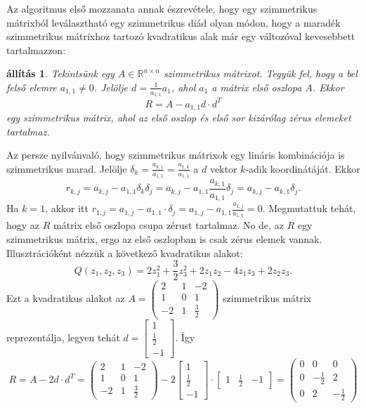 \documentclass[9pt, a4paper, showtrims]{memoir}
\makeatletter
\renewenvironment{proof}[1][\proofname]
    {\par\pushQED{\qed}%
    \normalfont \topsep6\p@\@plus6\p@\relax
    \trivlist
    \item[\hskip\labelsep
        \itshape
    #1\@addpunct{:}]\ignorespaces}
    {\popQED\endtrivlist\@endpefalse}
\theoremstyle{plain}
\newtheorem{proposition}{állítás}[chapter]
\theoremstyle{remark}
\theoremstyle{definition}
\makeatother
\begin{document}
Az algoritmus első mozzanata annak észrevétele, 
hogy egy szimmetrikus mátrixból leválasztható egy szimmetrikus diád olyan módon,
hogy a maradék szimmetrikus mátrixhoz tartozó kvadratikus alak már egy változóval kevesebbett tartalmazzon:
\begin{proposition}
    Tekintsünk egy $A\in\mathbb{R}^{n\times n}$ szimmetrikus mátrixot.
    Tegyük fel, hogy a bel felső elemre $a_{1,1}\neq 0$.
    Jelölje $d=\frac{1}{a_{1,1}}a_1$, ahol $a_1$ a mátrix első oszlopa $A$.
    Ekkor
    \[
        R=A-a_{1,1}d\cdot d^T
   \]
   egy szimmetrikus mátrix, 
   ahol az első oszlop és első sor kizárólag zérus elemeket tartalmaz.
\end{proposition}
\begin{proof}
    Az persze nyilvánvaló, hogy szimmetrikus mátrixok egy lináris kombinációja is szimmetrikus marad.
    Jelölje $\delta_k=\frac{a_{k,1}}{a_{1,1}}=\frac{a_{1,k}}{a_{1,1}}$ a $d$ vektor $k$-adik koordinátáját.
    Ekkor 
    \[
        r_{k,j}=
        a_{k,j}-a_{1,1}\delta_k\delta_j=
        a_{k,j}-a_{1,1}\frac{a_{k,1}}{a_{1,1}}\delta_j=
        a_{k,j}-a_{k,1}\delta_j.
        \tag{\dag}
    \]
    Ha $k=1$, akkor itt $r_{1,j}=a_{1,j}-a_{1,1}\cdot\delta_j=a_{1,j}-a_{1,1}\frac{a_{1,j}}{a_{1,1}}=0$.
    Megmutattuk tehát, hogy az $R$ mátrix első oszlopa csupa zérust tartalmaz. 
    No de, az $R$ egy szimmetrikus mátrix, ergo az első oszlopban is csak zérus elemek vannak.
    \end{proof}
    Illusztrációként nézzük a következő kvadratikus alakot:
    \[
        Q\left( z_1,z_2,z_3 \right)
        =
        2z_1^2+\frac{3}{2}z_3^2+2z_1z_2-4z_1z_3+2z_2z_3.
    \]
    Ezt a kvadratikus alakot az 
    \(A=
    \begin{pmatrix}
        2&1&-2\\
        1&0&1\\
        -2&1&\frac{3}{2}
    \end{pmatrix}
    \)
    szimmetrikus mátrix reprezentálja, 
    legyen tehát 
    \(d=
    \begin{bmatrix}
        1\\ \frac{1}{2}\\ -1
    \end{bmatrix}.
    \)
    Így 
    \[
        R=A-2d\cdot d^T
        =
        \begin{pmatrix}
        2&1&-2\\
        1&0&1\\
        -2&1&\frac{3}{2}
        \end{pmatrix}
        -2
        \begin{bmatrix}
        1\\ \frac{1}{2}\\ -1
        \end{bmatrix}
        \cdot
        \begin{bmatrix}
        1& \frac{1}{2}& -1
        \end{bmatrix}
        =
        \begin{pmatrix}
            0&0&0\\
            0&-\frac{1}{2}&2\\
            0&2&-\frac{1}{2}
        \end{pmatrix}
    \]
\end{document}
